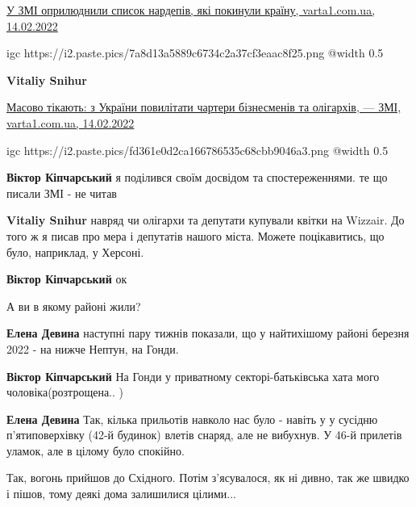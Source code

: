 \begin{itemize}
\href{https://varta1.com.ua/news/u-zmi-oprilyudnili-spisok-nardepiv-yaki-pokinuli-krayinu_341214.html}{%
У ЗМІ оприлюднили список нардепів, які покинули країну, varta1.com.ua, 14.02.2022%
}

\ifcmt
  igc https://i2.paste.pics/7a8d13a5889c6734c2a37cf3eaac8f25.png
	@width 0.5
\fi

\textbf{Vitaliy Snihur}

\href{https://varta1.com.ua/news/masovo-tikayut-z-ukrayini-povilitati-charteri-biznesmeniv-ta-oligarhiv---zmi_341196.html}{%
Масово тікають: з України повилітати чартери бізнесменів та олігархів, — ЗМІ, varta1.com.ua, 14.02.2022%
}

\ifcmt
  igc https://i2.paste.pics/fd361e0d2ca166786535c68cbb9046a3.png
	@width 0.5
\fi


\textbf{Віктор Кіпчарський} я поділився своїм досвідом та спостереженнями.
те що писали ЗМІ - не читав 🙂

\textbf{Vitaliy Snihur} навряд чи олігархи та депутати купували квітки на Wizzair.
До того ж я писав про мера і депутатів нашого міста.
Можете поцікавитись, що було, наприклад, у Херсоні.

\textbf{Віктор Кіпчарський} ок

\end{itemize} %


А ви в якому районі жили?

\begin{itemize} %
\textbf{Елена Девина} наступні пару тижнів показали, що у найтихішому районі березня 2022 - на нижче Нептун, на Гонди.

\textbf{Віктор Кіпчарський} На Гонди у приватному секторі-батьківська хата мого чоловіка(розтрощена.. )

\textbf{Елена Девина} Так, кілька прильотів навколо нас було - навіть у у сусідню п'ятиповерхівку (42-й будинок) влетів снаряд, але не вибухнув. У 46-й прилетів уламок, але в цілому було спокійно.
\end{itemize} %


Так, вогонь прийшов до Східного. Потім з'ясувалося, як ні дивно, так же швидко
і пішов, тому деякі дома залишилися цілими...


